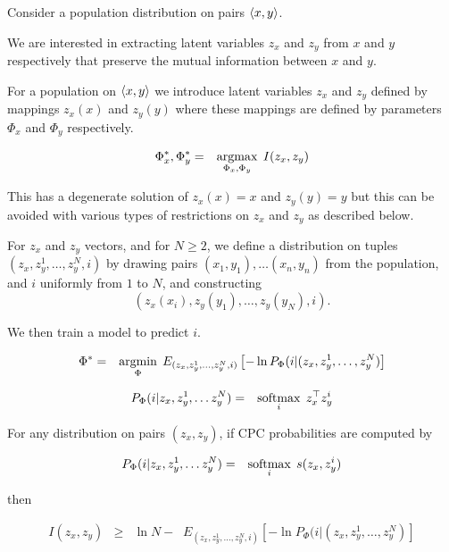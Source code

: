 {\vfill
Consider a population distribution on pairs ${\mbox{$\langle x,y\rangle$}}$.

\vfill
We are interested in extracting latent variables $z_x$ and $z_y$ from $x$ and $y$ respectively that preserve the mutual information between $x$ and $y$.


For a population on ${\mbox{$\langle x,y\rangle$}}$ we introduce latent variables $z_x$ and $z_y$ defined by
mappings $z_x(x)$ and $z_y(y)$ where these mappings are defined by parameters $\Phi_x$ and $\Phi_y$ respectively.

\begin{eqnarray*}
\Phi_x^*,\Phi_y^* & = & \operatorname*{argmax}_{\Phi_x,\Phi_y} \; I(z_x,z_y)
\end{eqnarray*}

This has a degenerate solution of $z_x(x) = x$ and $z_y(y) = y$ but this can be avoided with various types of restrictions on $z_x$ and $z_y$
as described below.


\vfill
For $z_x$ and $z_y$ vectors, and for $N \geq 2$, we define a distribution on tuples $(z_x,z_{y}^1,\ldots,z_y^N,i)$
by drawing pairs $(x_1,y_1), \ldots (x_n,y_n)$ from the population, and $i$ uniformly from $1$ to $N$,
and constructing
$$(z_x(x_i),z_y(y_1),\ldots,z_y(y_N),i).$$

\vfill
We then train a model to predict $i$.
\vfill
{\huge
\begin{eqnarray*}
\Phi^* & = & \operatorname*{argmin}_\Phi \;E_{(z_x,z_y^1,\ldots,z_y^N,i)}\left[-\ln P_\Phi(i|(z_x,z_y^1,\ldots,z_y^N)\right]
\end{eqnarray*}

\begin{eqnarray*}
P_\Phi(i|z_x,z_y^1,\ldots z_y^N) & = & \operatorname*{softmax}_i\; z_x^\top z_y^i
\end{eqnarray*}
}


For any distribution on pairs $(z_x,z_y)$, if CPC probabilities are computed by

{\huge
\begin{eqnarray*}
P_\Phi(i|z_x,z_y^1,\ldots z_y^N) & = & \operatorname*{softmax}_i\;s(z_x,z_y^i)
\end{eqnarray*}
}

then

{\huge
\begin{eqnarray*}
I(z_x,z_y) & \geq & \ln N - \;\;E_{(z_x,z_y^1,\ldots,z_y^N,i)}\left[-\ln P_\Phi(i|(z_x,z_y^1,\ldots,z_y^N)\right]
\end{eqnarray*}
}

}
